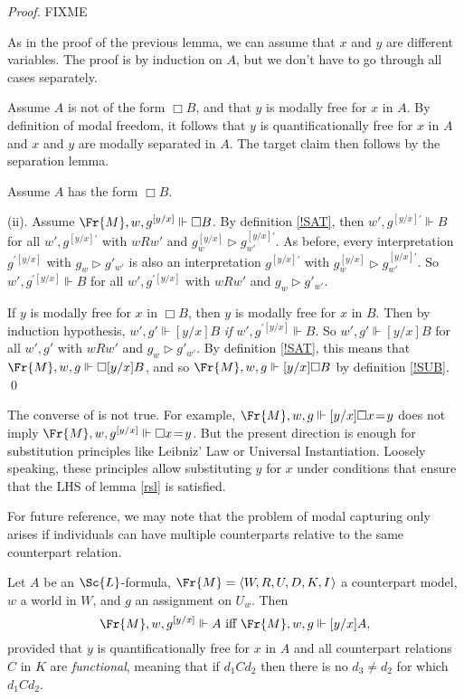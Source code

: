 \documentclass[11pt]{woarticle}
\theoremstyle{break}
\theoremstyle{nonumberplain}
\newcommand{\SAT}{\Vdash}
\newcommand{\Img}{\triangleright}
\newcommand{\1}{\;\,|\;\,}
\renewcommand{\t}[1]{\ensuremath{\langle #1  \makebox[.2ex]{}\rangle}}
\begin{document}
\begin{proof}
  FIXME
  
  As in the proof of the previous lemma, we can assume that $x$ and $y$ are
  different variables. The proof is by induction on $A$, but we don't have to go
  through all cases separately.

  Assume $A$ is not of the form $\Box B$, and that $y$ is modally free for $x$
  in $A$. By definition of modal freedom, it follows that $y$ is
  quantificationally free for $x$ in $A$ and $x$ and $y$ are modally separated
  in $A$. The target claim then follows by the separation lemma.

  Assume $A$ has the form $\Box B$.

    (ii). Assume $\Fr{M},w,g^{[y/x]} \SAT \Box B$. By definition \ref{!SAT},
    then $w',g^{[y/x]\prime} \SAT B$ for all $w',g^{[y/x]\prime}$ with
    $wRw'$ and $g^{[y/x]}_w \Img g^{[y/x]\prime}_{w'}$. As before,
    every interpretation $g^{\prime[y/x]}$ with $g_w \Img g'_{w'}$ is
    also an interpretation $g^{[y/x]\prime}$ with $g^{[y/x]}_w \Img
    g^{[y/x]\prime}_{w'}$. So $w',g^{\prime[y/x]} \SAT B$ for all
    $w',g^{\prime[y/x]}$ with $wRw'$ and $g_w \Img g'_{w'}$.
    
    If $y$ is modally free for $x$ in $\Box B$, then $y$ is modally
    free for $x$ in $B$. Then by induction hypothesis, $w',g' \SAT
    [y/x]B$ \emph{if} $w',g^{\prime [y/x]} \SAT B$. So $w',g' \SAT
    [y/x]B$ for all $w',g'$ with $wRw'$ and $g_w \Img g'_{w'}$. By
    definition \ref{!SAT}, this means that $\Fr{M},w,g \SAT \Box [y/x]B$, and
    so $\Fr{M},w,g \SAT [y/x] \Box B$ by definition \ref{!SUB}. \qed
    
\end{proof}

The converse of is not true. For example, $\Fr{M},w,g \SAT [y/x] \Box x\!=\!y$
does not imply $\Fr{M},w,g^{[y/x]} \SAT \Box x\!=\!y$. But the present direction
is enough for substitution principles like Leibniz' Law or Universal
Instantiation. Loosely speaking, these principles allow substituting $y$ for $x$
under conditions that ensure that the LHS of lemma \ref{rsl} is satisfied.

For future reference, we may note that the problem of modal capturing only
arises if individuals can have multiple counterparts relative to the same
counterpart relation.

\begin{lemma}\label{functional-substition-lemma}
  Let $A$ be an $\Sc{L}$-formula, $\Fr{M} = \t{W,R,U,D,K,I}$ a counterpart
  model, $w$ a world in $W$, and $g$ an assignment on $U_{w}$. Then
  \[
    \Fr{M},w,g^{[y/x]} \SAT A \text{ iff } \Fr{M},w,g \SAT [y/x]A,
  \]
  provided that $y$ is quantificationally free for $x$ in $A$ and all
  counterpart relations $C$ in $K$ are \emph{functional}, meaning that if
  $d_{1}Cd_{2}$ then there is no $d_{3} \not= d_{2}$ for which $d_{1}C d_{2}$.
\end{lemma}
\end{document}
